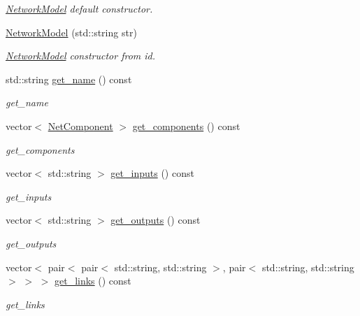 \begin{DoxyCompactItemize}
\begin{DoxyCompactList}\small\item\em \hyperlink{class_network_model}{Network\+Model} default constructor. \end{DoxyCompactList}\item 
\hyperlink{class_network_model_aa9163a8897dc4b0961d6b283fafb243d}{Network\+Model} (std\+::string str)
\begin{DoxyCompactList}\small\item\em \hyperlink{class_network_model}{Network\+Model} constructor from id. \end{DoxyCompactList}\item 
std\+::string \hyperlink{class_network_model_ade7b5e15e745b08ae6d5f13e0447ab20}{get\+\_\+name} () const 
\begin{DoxyCompactList}\small\item\em get\+\_\+name \end{DoxyCompactList}\item 
vector$<$ \hyperlink{class_net_component}{Net\+Component} $>$ \hyperlink{class_network_model_abce681ce925e7d379091932650177af3}{get\+\_\+components} () const 
\begin{DoxyCompactList}\small\item\em get\+\_\+components \end{DoxyCompactList}\item 
vector$<$ std\+::string $>$ \hyperlink{class_network_model_ad0f615741e4cf35edbdd0e1325b261f6}{get\+\_\+inputs} () const 
\begin{DoxyCompactList}\small\item\em get\+\_\+inputs \end{DoxyCompactList}\item 
vector$<$ std\+::string $>$ \hyperlink{class_network_model_aa26c3852306f0861ac86a312a3de0cc7}{get\+\_\+outputs} () const 
\begin{DoxyCompactList}\small\item\em get\+\_\+outputs \end{DoxyCompactList}\item 
vector$<$ pair$<$ pair$<$ std\+::string, std\+::string $>$, pair$<$ std\+::string, std\+::string $>$ $>$ $>$ \hyperlink{class_network_model_a83a9cf2752510f7a8d76cb6f91cf5c6a}{get\+\_\+links} () const 
\begin{DoxyCompactList}\small\item\em get\+\_\+links \end{DoxyCompactList}\item 

\end{DoxyCompactItemize}
